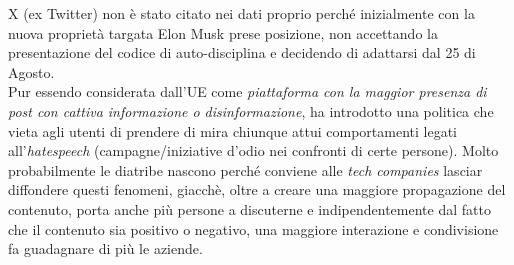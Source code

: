 \documentclass{article}
\begin{document}
\begin{justify}
    X (ex Twitter) non è stato citato nei dati proprio perché inizialmente con la nuova proprietà targata Elon Musk prese posizione, non accettando la presentazione del codice di auto-disciplina e decidendo di adattarsi dal 25 di Agosto.\\
    Pur essendo considerata dall'UE come \textit{piattaforma con la maggior presenza di post con cattiva informazione o disinformazione}, ha introdotto una politica che vieta agli utenti di prendere di mira chiunque attui comportamenti legati all'\textit{hatespeech} (campagne/iniziative d'odio nei confronti di certe persone).
    Molto probabilmente le diatribe nascono perché conviene alle \textit{tech companies} lasciar diffondere questi fenomeni, giacchè, oltre a creare una maggiore propagazione del contenuto, porta anche più persone a discuterne e indipendentemente dal fatto che il contenuto sia positivo o negativo, una maggiore interazione e condivisione fa guadagnare di più le aziende.
\end{justify}
\end{document}

